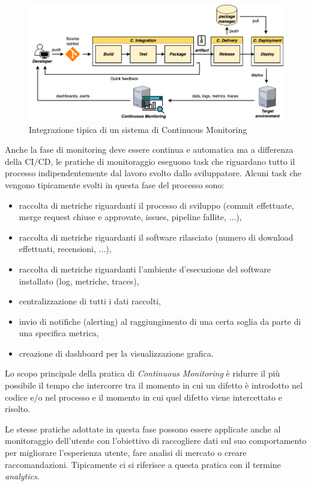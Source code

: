 \begin{figure}[H]
    \centering
    \includegraphics[width=1\textwidth]{img/ci-monitoring.png}
    \caption{Integrazione tipica di un sistema di Continuous Monitoring}
    \label{ci-monitoring}
\end{figure}

Anche la fase di monitoring deve essere continua e automatica ma a differenza della CI/CD, le pratiche di monitoraggio eseguono task che riguardano tutto il processo indipendentemente dal lavoro svolto dallo sviluppatore. Alcuni task che vengono tipicamente svolti in questa fase del processo sono:

\begin{itemize}
    \item raccolta di metriche riguardanti il processo di sviluppo (commit effettuate, merge request chiuse e approvate, issues, pipeline fallite, ...),
    \item raccolta di metriche riguardanti il software rilasciato (numero di download effettuati, recensioni, ...),
    \item raccolta di metriche riguardanti l'ambiente d'esecuzione del software installato (log, metriche, traces),
    \item centralizzazione di tutti i dati raccolti,
    \item invio di notifiche (alerting) al raggiungimento di una certa soglia da parte di una specifica metrica,
    \item creazione di dashboard per la visualizzazione grafica.
\end{itemize}

Lo scopo principale della pratica di \textit{Continuous Monitoring} è ridurre il più possibile il tempo che intercorre tra il momento in cui un difetto è introdotto nel codice e/o nel processo e il momento in cui quel difetto viene intercettato e risolto.

Le stesse pratiche adottate in questa fase possono essere applicate anche al monitoraggio dell'utente con l'obiettivo di raccogliere dati sul suo comportamento per migliorare l'esperienza utente, fare analisi di mercato o creare raccomandazioni. Tipicamente ci si riferisce a questa pratica con il termine \textit{analytics}.

